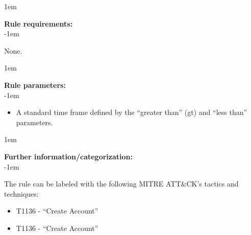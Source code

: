 \openup 1em

{\bf Rule requirements:} \\

\openup -1em
\vspace{-2em}

None.

\openup 1em

{\bf Rule parameters:} \\

\openup -1em
\vspace{-2em}

\begin{itemize}
	\item A standard time frame defined by the ``greater than'' (gt) and ``less than'' parameters.
\end{itemize}

\openup 1em

{\bf Further information/categorization:} \\

\openup -1em
\vspace{-2em}


The rule can be labeled with the following MITRE ATT\&CK's tactics and techniques:
\begin{itemize}
	\item T1136 - ``Create Account''
	\item T1136 - ``Create Account''
\end{itemize}

\pagebreak

